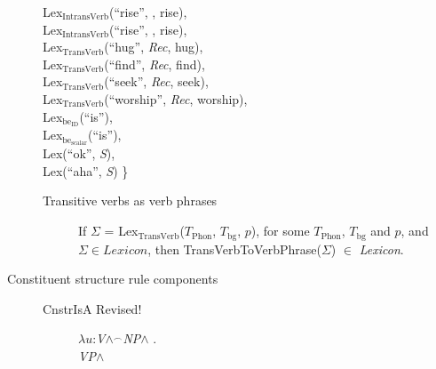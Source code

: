 \begin{description}
\begin{tabbing}
\> Lex$_{\mathrm{IntransVerb}}$(``rise'', ,
rise), \\
\> Lex$_{\mathrm{IntransVerb}}$(``rise'', ,
rise), \\
\> Lex$_{\mathrm{TransVerb}}$(``hug'', \textit{Rec}, hug), \\
\> Lex$_{\mathrm{TransVerb}}$(``find'', \textit{Rec}, find), \\
\> Lex$_{\mathrm{TransVerb}}$(``seek'', \textit{Rec}, seek), \\
\> Lex$_{\mathrm{TransVerb}}$(``worship'', \textit{Rec}, worship), \\
\> Lex$_{\mathrm{be}_{\text{ID}}}$(``is''), \\
\> Lex$_{\mathrm{be}_{\text{scalar}}}$(``is''), \\
\> Lex(``ok'', \textit{S}),  \\
\> Lex(``aha'', \textit{S})  \}
\end{tabbing}

\begin{description}
  
\item[Transitive verbs as verb phrases] \mbox{}

If $\Sigma$ = Lex$_{\text{TransVerb}}$($T_{\text{Phon}}$,
$T_{\text{bg}}$, $p$), for some $T_{\text{Phon}}$, $T_{\text{bg}}$ and
$p$, and $\Sigma\in\textit{Lexicon}$, then
TransVerbToVerbPhrase($\Sigma$) $\in$ \textit{Lexicon}.
\end{description}

\item[Constituent structure rule components] \mbox{} 
  \begin{description}

    \item[\textnormal{CnstrIsA} Revised!] \mbox{}

  $\lambda
u$:\textit{V}\d{$\wedge$}$^{\frown}$\textit{NP}\d{$\wedge$} . \\
\hspace*{1em} \textit{VP}\d{$\wedge$} 


\end{description}
\end{description}
